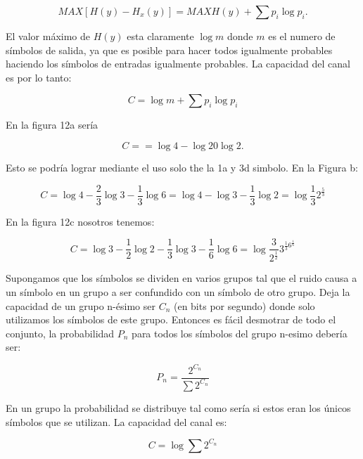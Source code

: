 \begin{equation}
  MAX [H(y) - H_x(y)] = MAX H(y) + \sum p_i \log{p_i}.
\end{equation}
  
El valor m\'aximo de $H(y)$ esta claramente  $\log{m}$ donde $m$ es el numero de s\'imbolos de salida, ya que es posible para hacer 
todos igualmente probables haciendo los s\'imbolos de entradas igualmente probables. La capacidad del canal es por lo tanto:

\begin{equation}
  C = \log{m} + \sum p_i \log{p_i}
\end{equation}

En la figura 12a ser\'ia 

\begin{equation}
  C = = \log{4} - \log{2} 0 \log{2}.
\end{equation}

Esto se podr\'ia lograr mediante el uso solo the la 1a y 3d simbolo. En la Figura b:

\begin{equation}
  C = \log{4} - \frac{2}{3}\log{3} - \frac{1}{3}\log{6}
  = \log{4} - \log{3} - \frac{1}{3}\log{2}
  = \log{\frac{1}{3}} 2^{\frac{5}{3}}
\end{equation}

En la figura 12c nosotros tenemos:

\begin{equation}
  C = \log{3} - \frac{1}{2}\log{2} - \frac{1}{3}\log{3} - \frac{1}{6} \log{6}
  = \log  {\frac{3}{ 2^{\frac{1}{2}}}} 3^{\frac{1}{3} 6^{\frac{1}{6} }}
\end{equation}

Supongamos que los s\'imbolos se dividen en varios grupos tal que el ruido causa a un s\'imbolo en un grupo a 
ser confundido con un s\'imbolo de otro grupo. Deja la capacidad de un grupo n-\'esimo ser $C_n$ (en bits por segundo)
donde solo utilizamos los s\'imbolos de este grupo. Entonces es f\'acil desmotrar  de todo el conjunto, 
la probabilidad $P_n$ para todos los s\'imbolos del grupo n-esimo deber\'ia ser:

\begin{equation}
  P_n = \frac{2^{C_n}}{\sum 2^{C_n}}
\end{equation}

En un grupo la probabilidad se distribuye tal como ser\'ia si estos eran los \'unicos s\'imbolos que se utilizan. 
La capacidad del canal es:

\begin{equation}
  C = \log{\sum 2^{C_n}}
\end{equation}



